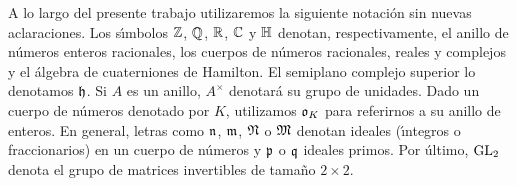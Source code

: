 A lo largo del presente trabajo utilizaremos la siguiente notaci\'{o}n sin
nuevas aclaraciones. Los s\'{\i}mbolos $\bb{Z}$, $\bb{Q}$, $\bb{R}$, $\bb{C}$ y
$\bb{H}$ denotan, respectivamente, el anillo de n\'{u}meros enteros racionales,
los cuerpos de n\'{u}meros racionales, reales y complejos y el \'{a}lgebra de
cuaterniones de Hamilton. El semiplano complejo superior lo denotamos $\hP$. Si
$A$ es un anillo, $A^{\times}$ denotar\'{a} su grupo de unidades. Dado un
cuerpo de n\'{u}meros denotado por $K$, utilizamos $\oka{K}$ para referirnos a
su anillo de enteros. En general, letras como $\frak{n}$, $\frak{m}$,
$\frak{N}$ o $\frak{M}$ denotan ideales (\'{\i}ntegros o fraccionarios) en un
cuerpo de n\'{u}meros y $\frak{p}$ o $\frak{q}$ ideales primos. Por \'{u}ltimo,
$\GL_{2}$ denota el grupo de matrices invertibles de tama\~{n}o $2\times 2$.
